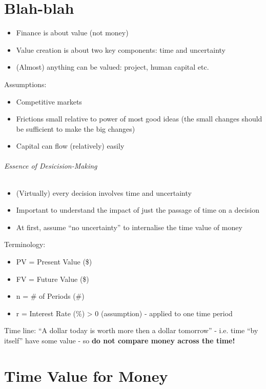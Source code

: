 \documentclass{scrartcl}
\begin{document}
\part{Blah-blah}
\label{par:1}

\begin{itemize}
\item Finance is about value (not money)
\item Value creation is about two key components: time and uncertainty
\item (Almost) anything can be valued: project, human capital etc.
\end{itemize}

Assumptions:
\begin{itemize}
\item Competitive markets
\item Frictions small relative to power of most good ideas (the small changes
  should be sufficient to make the big changes)
\item Capital can flow (relatively) easily
\end{itemize}

\paragraph{Essence of Desicision-Making}
\begin{itemize}
\item (Virtually) every decision involves time and uncertainty
\item Important to understand the impact of just the passage of time on a
  decision
\item At first, assume ``no uncertainty'' to internalise the time value of money
\end{itemize}
Terminology:
\begin{itemize}
\item PV = Present Value (\$)
\item FV = Future Value (\$)
\item n = \# of Periods (\#)
\item r = Interest Rate (\%) > 0 (assumption) - applied to one time period
\end{itemize}
Time line: ``A dollar today is worth more then a dollar tomorrow'' - i.e. time
``by itself'' have some value - so {\bf do not compare money across the time!}

\part{Time Value for Money}
\label{part:2}
\end{document}
